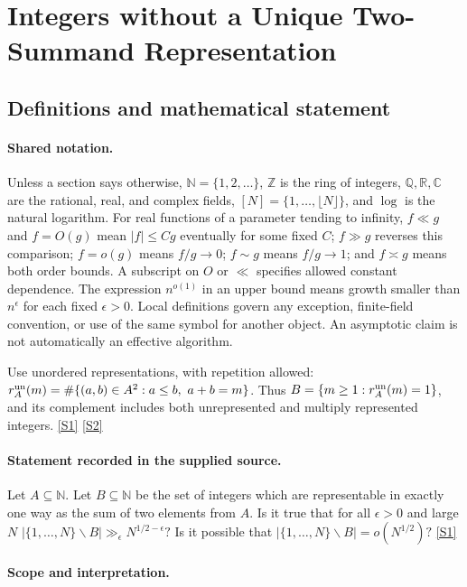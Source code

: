 \documentclass[11pt,a4paper]{article}
\newcommand{\N}{\mathbb{N}}
\newcommand{\Z}{\mathbb{Z}}
\newcommand{\Q}{\mathbb{Q}}
\newcommand{\R}{\mathbb{R}}
\newcommand{\C}{\mathbb{C}}
\newcommand{\sref}[2]{\hyperlink{source:#1:#2}{[S#2]}}
\begin{document}
\section{Integers without a Unique Two-Summand Representation}\label{statement}


\subsection{Definitions and mathematical statement}

\paragraph{Shared notation.}Unless a section says otherwise, $\N=\{1,2,\ldots\}$,
$\Z$ is the ring of integers, $\Q,\R,\C$ are the rational, real, and complex
fields, $[N]=\{1,\ldots,\lfloor N\rfloor\}$, and $\log$ is the natural
logarithm. For real functions of a parameter tending to infinity,
$f\ll g$ and $f=O(g)$ mean $|f|\leq Cg$ eventually for some fixed $C$;
$f\gg g$ reverses this comparison; $f=o(g)$ means $f/g\to0$;
$f\sim g$ means $f/g\to1$; and $f\asymp g$ means both order bounds.
A subscript on $O$ or $\ll$ specifies allowed constant dependence.
The expression $n^{o(1)}$ in an upper bound means growth smaller than
$n^\epsilon$ for each fixed $\epsilon>0$. Local definitions govern any
exception, finite-field convention, or use of the same symbol for another
object. An asymptotic claim is not automatically an effective algorithm.



Use unordered representations, with repetition allowed: $r_A^{\rm un}(m)=\#\{(a,b)\in A^2:a\leq b,\ a+b=m\}$. Thus $B=\{m\geq1:r_A^{\rm un}(m)=1\}$, and its complement includes both unrepresented and multiply represented integers. \sref{statement}{1} \sref{statement}{2}

\paragraph{Statement recorded in the supplied source.}
Let $A\subseteq \mathbb{N}$. Let $B\subseteq \mathbb{N}$ be the set of integers which are representable in exactly one way as the sum of two elements from $A$.
Is it true that for all $\epsilon>0$ and large $N$ $ \lvert \{1,\ldots,N\}\backslash B\rvert \gg_\epsilon N^{1/2-\epsilon}? $ Is it possible that $ \lvert \{1,\ldots,N\}\backslash B\rvert =o(N^{1/2})? $ \sref{statement}{1}

\paragraph{Scope and interpretation.}
\end{document}
